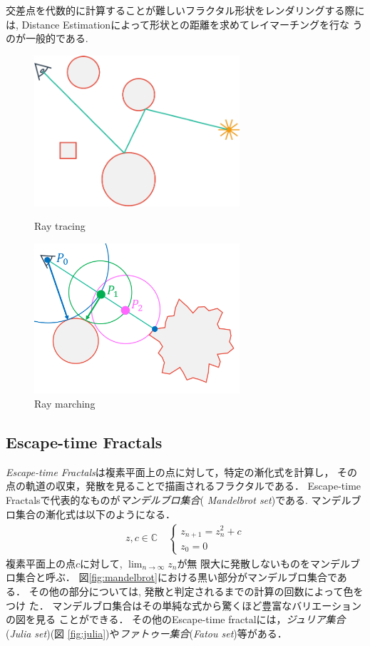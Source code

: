 交差点を代数的に計算することが難しいフラクタル形状をレンダリングする際に
は, Distance Estimationによって形状との距離を求めてレイマーチングを行な
うのが一般的である.

 \begin{figure}[htbp]
  \begin{minipage}{0.5\hsize}
   \center
   \includegraphics[width=3in, keepaspectratio]{../img/fractal/raytrace.pdf}
   \caption{Ray tracing}
   \label{fig:raytrace}
  \end{minipage}
  \begin{minipage}{0.5\hsize}
   \center
   \includegraphics[width=3in, keepaspectratio]{../img/fractal/raymarching.pdf}
   \caption{Ray marching}
   \label{fig:raymarch}
  \end{minipage}
 \end{figure}

\subsection{Escape-time Fractals}

{\it Escape-time Fractals}は複素平面上の点に対して，特定の漸化式を計算し，
その点の軌道の収束，発散を見ることで描画されるフラクタルである．
Escape-time Fractalsで代表的なものが\emph{マンデルブロ集合}({\it
Mandelbrot set})である.
マンデルブロ集合の漸化式は以下のようになる．
\begin{eqnarray*}
 z, c \in \mathbb{C} \quad
 \begin{cases}
  z_{n+1} = z^2_{n} + c \\ z_0 = 0
 \end{cases}
\end{eqnarray*}
複素平面上の点$c$に対して, $\displaystyle \lim_{n \to \infty} z_n$が無
限大に発散しないものをマンデルブロ集合と呼ぶ．
図\ref{fig:mandelbrot}における黒い部分がマンデルブロ集合である．
その他の部分については, 発散と判定されるまでの計算の回数によって色をつけ
た．
マンデルブロ集合はその単純な式から驚くほど豊富なバリエーションの図を見る
ことができる．
その他のEscape-time fractalには，\emph{ジュリア集合}({\it Julia set})(図
\ref{fig:julia})や\emph{ファトゥー集合}({\it Fatou set})等がある．

